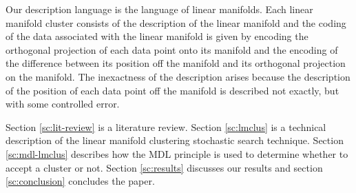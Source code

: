 Our description language is the language of linear manifolds. Each linear
manifold cluster consists of the description of the linear manifold and
the coding of the data associated with the linear manifold is given by encoding
the orthogonal projection of each data point onto its manifold and the encoding
of the difference between its position off the manifold and its orthogonal
projection on the manifold. The inexactness of the description arises because
the description of the position of each data point off the manifold is
described not exactly, but with some controlled error.


Section \ref{sc:lit-review} is a literature review. Section \ref{sc:lmclus}
is a technical description of the linear manifold clustering stochastic search
technique. Section \ref{sc:mdl-lmclus} describes how the MDL principle is used
to determine whether to accept a cluster or not. Section \ref{sc:results}
discusses our results and section \ref{sc:conclusion} concludes the paper.
